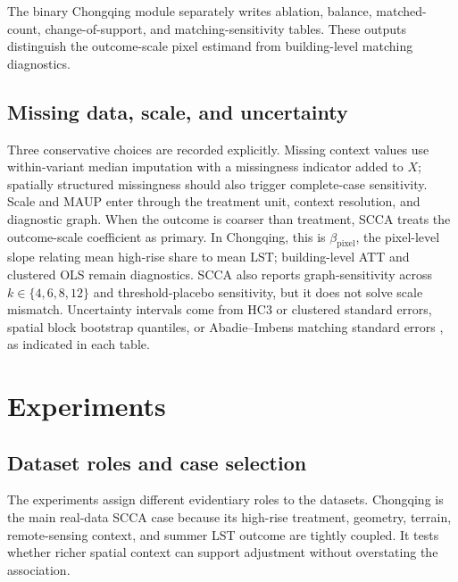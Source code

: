 \documentclass{article}
\begin{document}
The binary Chongqing module separately writes ablation, balance, matched-count, change-of-support, and matching-sensitivity tables. These outputs distinguish the outcome-scale pixel estimand from building-level matching diagnostics.

\subsection{Missing data, scale, and uncertainty}
\label{sec:missing_scale_ci}

Three conservative choices are recorded explicitly. Missing context values use within-variant median imputation with a missingness indicator added to $X$; spatially structured missingness should also trigger complete-case sensitivity. Scale and MAUP \citep{openshaw1984maup,fotheringham1991modifiable,manley2006maup} enter through the treatment unit, context resolution, and diagnostic graph. When the outcome is coarser than treatment, SCCA treats the outcome-scale coefficient as primary. In Chongqing, this is $\beta_{\mathrm{pixel}}$, the pixel-level slope relating mean high-rise share to mean LST; building-level ATT and clustered OLS remain diagnostics. SCCA also reports graph-sensitivity across $k \in \{4, 6, 8, 12\}$ and threshold-placebo sensitivity, but it does not solve scale mismatch. Uncertainty intervals come from HC3 or clustered standard errors, spatial block bootstrap quantiles, or Abadie--Imbens matching standard errors \citep{abadie2006matchingse}, as indicated in each table.


\section{Experiments}
\label{sec:experiments}

\subsection{Dataset roles and case selection}

The experiments assign different evidentiary roles to the datasets. Chongqing is the main real-data SCCA case because its high-rise treatment, geometry, terrain, remote-sensing context, and summer LST outcome are tightly coupled. It tests whether richer spatial context can support adjustment without overstating the association.
\end{document}
